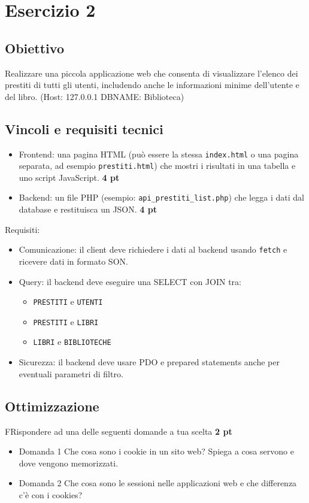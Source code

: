 \documentclass[a4paper,12pt]{article}
\begin{document}
	\section*{Esercizio 2}
	
	\subsection*{Obiettivo}
	
	Realizzare una piccola applicazione web che consenta di visualizzare l'elenco dei
	prestiti di tutti gli utenti, includendo anche le informazioni minime dell'utente
	e del libro. (Host: 127.0.0.1  DBNAME: Biblioteca)
	
	\subsection*{Vincoli e requisiti tecnici}
	
	\begin{itemize}
		\item Frontend: una pagina HTML (può essere la stessa \texttt{index.html} o
		una pagina separata, ad esempio \texttt{prestiti.html}) che mostri i
		risultati in una tabella e uno script JavaScript. \textbf{4 pt}
		\item Backend: un file PHP (esempio: \texttt{api\_prestiti\_list.php}) che
		legga i dati dal database e restituisca un JSON. \textbf{4 pt}
	\end{itemize}
	
	Requisiti:
	\begin{itemize}
		\item Comunicazione: il client deve richiedere i dati al backend usando
		\texttt{fetch} e ricevere dati in formato SON.
		\item Query: il backend deve eseguire una SELECT con JOIN tra:
		\begin{itemize}
			\item \texttt{PRESTITI} e \texttt{UTENTI}
			\item \texttt{PRESTITI} e \texttt{LIBRI}
			\item \texttt{LIBRI} e \texttt{BIBLIOTECHE}
		\end{itemize}
		\item Sicurezza: il backend deve usare PDO e prepared statements anche per
		eventuali parametri di filtro.
	\end{itemize}
	
	\subsection*{Ottimizzazione}
	
	FRispondere ad una delle seguenti domande a tua scelta \textbf{2 pt}
	
	\begin{itemize}
		\item Domanda 1
		Che cosa sono i cookie in un sito web? Spiega a cosa servono e dove vengono memorizzati.
		
		\item Domanda 2
		Che cosa sono le sessioni nelle applicazioni web e che differenza c'è con i cookies? 
	\end{itemize}
	
\end{document}
